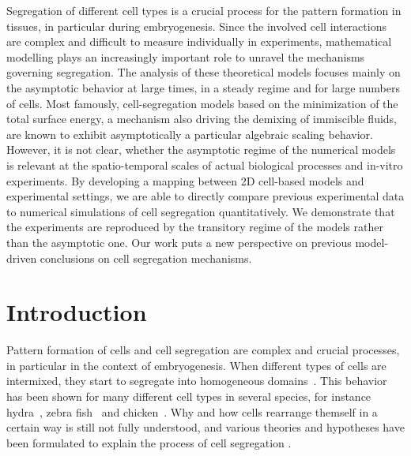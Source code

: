 \documentclass[10pt,letterpaper]{article}
\begin{document}
Segregation of different cell types is a crucial process for the
pattern formation in tissues, in particular during embryogenesis.
Since the involved cell interactions are complex and difficult to
measure individually in experiments, mathematical modelling plays an
increasingly important role to unravel the mechanisms governing
segregation. The analysis of these theoretical models focuses mainly
on the asymptotic behavior at large times, in a steady regime and for
large numbers of cells. Most famously, cell-segregation models based
on the minimization of the total surface energy, a mechanism also
driving the demixing of immiscible fluids, are known to exhibit
asymptotically a particular algebraic scaling behavior. However, it is
not clear, whether the asymptotic regime of the numerical models is
relevant at the spatio-temporal scales of actual biological processes
and in-vitro experiments. By developing a mapping between 2D cell-based
models and experimental settings, we are able to directly compare
previous experimental data to numerical simulations of cell
segregation quantitatively. We demonstrate that the experiments are
reproduced by the transitory regime of the models rather than the
asymptotic one. Our work puts a new perspective on previous
model-driven conclusions on cell segregation mechanisms.


\section*{Introduction}

Pattern formation of cells and cell segregation are complex and
crucial processes, in particular in the context of embryogenesis. When
different types of cells are intermixed, they start to segregate into
homogeneous domains~\cite{TowHol1955, CerEtal2015, XioEtal2013,
  KayTho2009, CanZarKasFraFag2017}. This behavior has been shown for many different cell
types in several species, for instance hydra~\cite{RieSaw2002, Ste2007}, zebra
fish~\cite{KriEtal2008} and chicken~\cite{MomEtal1995,
FotPflForSte1996}. Why and how cells rearrange themself in a certain
way is still not fully understood, and various theories and hypotheses
have been formulated to explain the process of cell segregation
\cite{KreHei2011, GlaGra1992, GlaGra1993, Ste1970,
  MehVic2013, KriEtal2008, BelThoBruAlmCha2008, NakIsh2011,
  BeaBru2011, MehMonNemVic2012, VosDeu2010, CanZarKasFraFag2017, Har1976}.
\end{document}
